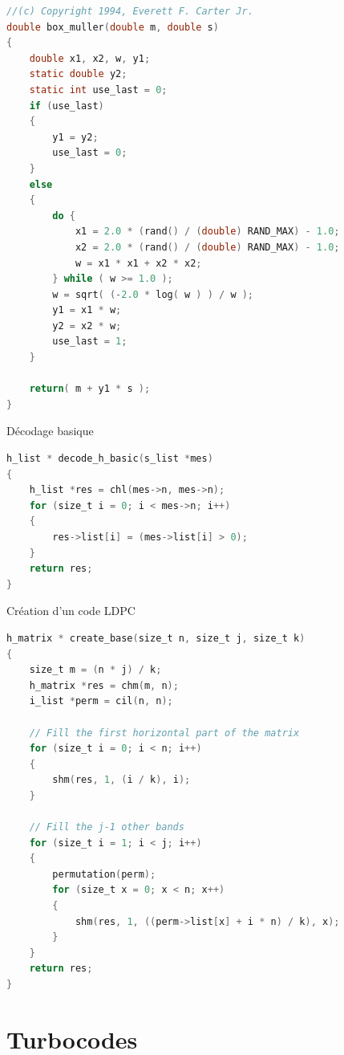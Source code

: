 \documentclass[11pt]{beamer}
\begin{document}
\begin{frame}
	\begin{lstlisting}[language=C]
//(c) Copyright 1994, Everett F. Carter Jr.
double box_muller(double m, double s)
{
	double x1, x2, w, y1;
	static double y2;
	static int use_last = 0;
	if (use_last)
	{
		y1 = y2;
		use_last = 0;
	}
	else
	{
		do {
			x1 = 2.0 * (rand() / (double) RAND_MAX) - 1.0;
			x2 = 2.0 * (rand() / (double) RAND_MAX) - 1.0;
			w = x1 * x1 + x2 * x2;
		} while ( w >= 1.0 );
		w = sqrt( (-2.0 * log( w ) ) / w );
		y1 = x1 * w;
		y2 = x2 * w;
		use_last = 1;
	}
	
	return( m + y1 * s );
}
	\end{lstlisting}
\end{frame}

\begin{frame}{D\'ecodage basique}
	\begin{lstlisting}[language=C]
h_list * decode_h_basic(s_list *mes)
{
	h_list *res = chl(mes->n, mes->n);
	for (size_t i = 0; i < mes->n; i++)
	{
		res->list[i] = (mes->list[i] > 0);
	}
	return res;
}
	\end{lstlisting}
\end{frame}


\begin{frame}{Cr\'eation d'un code LDPC}
	\begin{lstlisting}[language=C]
h_matrix * create_base(size_t n, size_t j, size_t k)
{
    size_t m = (n * j) / k;
    h_matrix *res = chm(m, n);
    i_list *perm = cil(n, n);

    // Fill the first horizontal part of the matrix
    for (size_t i = 0; i < n; i++)
    {
        shm(res, 1, (i / k), i);
    }

    // Fill the j-1 other bands
    for (size_t i = 1; i < j; i++)
    {
        permutation(perm);
        for (size_t x = 0; x < n; x++)
        {
            shm(res, 1, ((perm->list[x] + i * n) / k), x);
        }
    }
    return res;
}
	\end{lstlisting}
\end{frame}

\section{Turbocodes}
\end{document}
